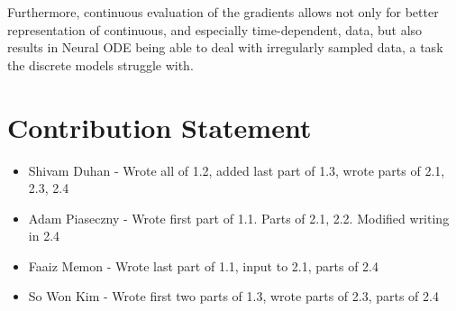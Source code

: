 \documentclass{article}
\begin{document}
Furthermore, continuous evaluation of the gradients allows not only for better representation of continuous, and especially time-dependent, data, but also results in Neural ODE being able to deal with irregularly sampled data, a task the discrete models struggle with.




\section{Contribution Statement}
\begin{itemize}
    \item Shivam Duhan - Wrote all of 1.2, added last part of 1.3, wrote parts of 2.1, 2.3, 2.4
    \item Adam Piaseczny - Wrote first part of 1.1. Parts of 2.1, 2.2. Modified writing in 2.4
    \item Faaiz Memon - Wrote last part of 1.1, input to 2.1, parts of 2.4
    \item So Won Kim - Wrote first two parts of 1.3, wrote parts of 2.3, parts of 2.4
\end{itemize}
    
\end{document}
